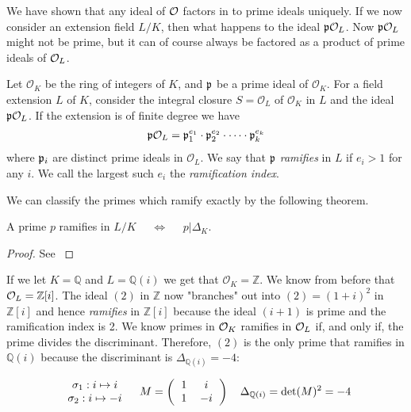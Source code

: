     We have shown that any ideal of \(\mathcal{O}\) factors in to prime ideals uniquely. If we now consider an extension field \(L/K\), then what happens to the ideal \(\mathfrak{p}\mathcal{O}_L\). Now \(\mathfrak{p}\mathcal{O}_L\) might not be prime, but it can of course always be factored as a product of prime ideals of \(\mathcal{O}_L\). 

    \begin{definition}[Ramification]
    Let \(\mathcal{O}_K\) be the ring of integers of \(K\), and \(\mathfrak{p}\) be a prime ideal of \(\mathcal{O}_K\). For a field extension \(L\) of \(K\), consider the integral closure \(S = \mathcal{O}_L\) of \(\mathcal{O}_K\) in \(L\) and the ideal \(\mathfrak{p}\mathcal{O}_L\). If the extension is of finite degree we have
    \begin{align*}
        \mathfrak{p}\mathcal{O}_L = \mathfrak{p}_1^{e_1}\cdot\mathfrak{p}_2^{e_2}\cdot\dots\cdot\mathfrak{p}_k^{e_k}
    \end{align*}
    where \(\mathfrak{p}_i\) are distinct prime ideals in \(\mathcal{O}_L\). We say that \(\mathfrak{p}\) \emph{ramifies} in \(L\) if \(e_i > 1\) for any \(i\). We call the largest such \(e_i\) the \emph{ramification index}.
    \end{definition}
    We can classify the primes which ramify exactly by the following theorem.
    \begin{theorem}
    \label{Eq: Prime Discriminant Division Theorem}
        A prime \(p\) ramifies in \(L/K\) \(\quad\Leftrightarrow\quad\) \(p|\Delta_K\).
    \end{theorem}
    \begin{proof}
        See \cite{Basic Algebraic Number Theory}
    \end{proof}
    
    If we let \(K = \mathbb{Q}\) and \(L = \mathbb{Q}(i)\) we get that \(\mathcal{O}_K = \mathbb{Z}\). We know from before that \(\mathcal{O}_L = \mathbb{Z}[i]\). The ideal \((2)\) in \(\mathbb{Z}\) now "branches" out into \((2) = (1+i)^2\) in \(\mathbb{Z}[i]\) and hence \emph{ramifies} in \(\mathbb{Z}[i]\) because the ideal \((i+1)\) is prime and the ramification index is 2. We know primes in \(\mathcal{O}_K\) ramifies in \(\mathcal{O}_L\) if, and only if, the prime divides the discriminant\cite{Eq: Prime Discriminant Division Theorem}. Therefore, \((2)\) is the only prime that ramifies in \(\mathbb{Q}(i)\) because the discriminant is \(\Delta_{\mathbb{Q}(i)} = -4\):
    
    \begin{align*}
        \begin{tabular}{c}
        \(\sigma_1:i\mapsto i\) \\
        \(\sigma_2:i\mapsto -i\)
        \end{tabular}
        \quad
        M = \left(\begin{tabular}{cc}
             \(1\) & \(i\) \\
             \(1\) & \(-i\)
        \end{tabular}\right)
        \quad
        \Delta_{\mathbb{Q}(i)} = \text{det}(M)^2 = -4
    \end{align*}

